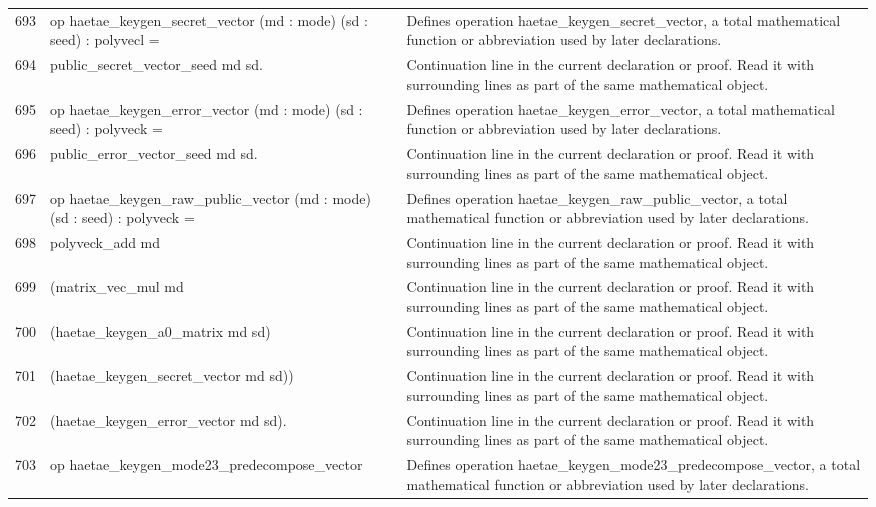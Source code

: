 \documentclass[10pt]{article}
\begin{document}
\begin{longtable}{r L{0.53\textwidth} L{0.37\textwidth}}
693 & {\ttfamily\scriptsize op haetae\_keygen\_secret\_vector (md : mode) (sd : seed) : polyvecl =} & Defines operation haetae\_keygen\_secret\_vector, a total mathematical function or abbreviation used by later declarations. \\
694 & {\ttfamily\scriptsize   public\_secret\_vector\_seed md sd.} & Continuation line in the current declaration or proof.  Read it with surrounding lines as part of the same mathematical object. \\
695 & {\ttfamily\scriptsize op haetae\_keygen\_error\_vector (md : mode) (sd : seed) : polyveck =} & Defines operation haetae\_keygen\_error\_vector, a total mathematical function or abbreviation used by later declarations. \\
696 & {\ttfamily\scriptsize   public\_error\_vector\_seed md sd.} & Continuation line in the current declaration or proof.  Read it with surrounding lines as part of the same mathematical object. \\
697 & {\ttfamily\scriptsize op haetae\_keygen\_raw\_public\_vector (md : mode) (sd : seed) : polyveck =} & Defines operation haetae\_keygen\_raw\_public\_vector, a total mathematical function or abbreviation used by later declarations. \\
698 & {\ttfamily\scriptsize   polyveck\_add md} & Continuation line in the current declaration or proof.  Read it with surrounding lines as part of the same mathematical object. \\
699 & {\ttfamily\scriptsize     (matrix\_vec\_mul md} & Continuation line in the current declaration or proof.  Read it with surrounding lines as part of the same mathematical object. \\
700 & {\ttfamily\scriptsize       (haetae\_keygen\_a0\_matrix md sd)} & Continuation line in the current declaration or proof.  Read it with surrounding lines as part of the same mathematical object. \\
701 & {\ttfamily\scriptsize       (haetae\_keygen\_secret\_vector md sd))} & Continuation line in the current declaration or proof.  Read it with surrounding lines as part of the same mathematical object. \\
702 & {\ttfamily\scriptsize     (haetae\_keygen\_error\_vector md sd).} & Continuation line in the current declaration or proof.  Read it with surrounding lines as part of the same mathematical object. \\
703 & {\ttfamily\scriptsize op haetae\_keygen\_mode23\_predecompose\_vector} & Defines operation haetae\_keygen\_mode23\_predecompose\_vector, a total mathematical function or abbreviation used by later declarations. \\

\end{longtable}
\end{document}
